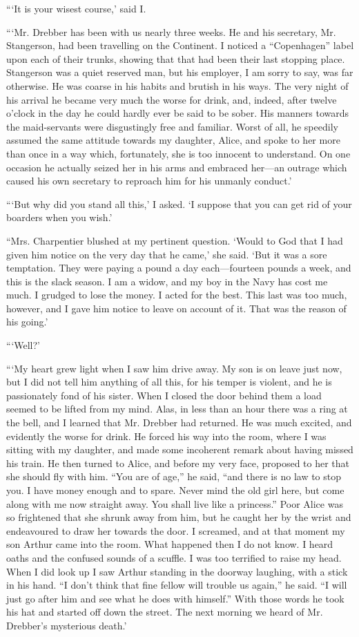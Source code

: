 \documentclass[12pt]{book}
\begin{document}
“‘It is your wisest course,’ said I. 

“‘Mr. Drebber has been with us nearly three weeks. He and his secretary, Mr. Stangerson, had been travelling on the Continent. I noticed a “Copenhagen” label upon each of their trunks, showing that that had been their last stopping place. Stangerson was a quiet reserved man, but his employer, I am sorry to say, was far otherwise. He was coarse in his habits and brutish in his ways. The very night of his arrival he became very much the worse for drink, and, indeed, after twelve o’clock in the day he could hardly ever be said to be sober. His manners towards the maid-servants were disgustingly free and familiar. Worst of all, he speedily assumed the same attitude towards my daughter, Alice, and spoke to her more than once in a way which, fortunately, she is too innocent to understand. On one occasion he actually seized her in his arms and embraced her—an outrage which caused his own secretary to reproach him for his unmanly conduct.’ 

“‘But why did you stand all this,’ I asked. ‘I suppose that you can get rid of your boarders when you wish.’ 

“Mrs. Charpentier blushed at my pertinent question. ‘Would to God that I had given him notice on the very day that he came,’ she said. ‘But it was a sore temptation. They were paying a pound a day each—fourteen pounds a week, and this is the slack season. I am a widow, and my boy in the Navy has cost me much. I grudged to lose the money. I acted for the best. This last was too much, however, and I gave him notice to leave on account of it. That was the reason of his going.’ 

“‘Well?’ 

“‘My heart grew light when I saw him drive away. My son is on leave just now, but I did not tell him anything of all this, for his temper is violent, and he is passionately fond of his sister. When I closed the door behind them a load seemed to be lifted from my mind. Alas, in less than an hour there was a ring at the bell, and I learned that Mr. Drebber had returned. He was much excited, and evidently the worse for drink. He forced his way into the room, where I was sitting with my daughter, and made some incoherent remark about having missed his train. He then turned to Alice, and before my very face, proposed to her that she should fly with him. “You are of age,” he said, “and there is no law to stop you. I have money enough and to spare. Never mind the old girl here, but come along with me now straight away. You shall live like a princess.” Poor Alice was so frightened that she shrunk away from him, but he caught her by the wrist and endeavoured to draw her towards the door. I screamed, and at that moment my son Arthur came into the room. What happened then I do not know. I heard oaths and the confused sounds of a scuffle. I was too terrified to raise my head. When I did look up I saw Arthur standing in the doorway laughing, with a stick in his hand. “I don’t think that fine fellow will trouble us again,” he said. “I will just go after him and see what he does with himself.” With those words he took his hat and started off down the street. The next morning we heard of Mr. Drebber’s mysterious death.’ 
\end{document}
